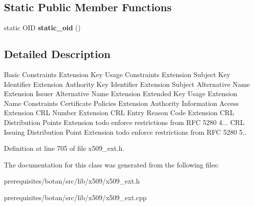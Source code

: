\subsection*{Static Public Member Functions}
\begin{DoxyCompactItemize}
\item 
\mbox{\label{class_botan_1_1_cert___extension_1_1_c_r_l___issuing___distribution___point_aade07378961504397ff8e7917442a18a}} 
static O\+ID {\bfseries static\+\_\+oid} ()
\end{DoxyCompactItemize}


\subsection{Detailed Description}
Basic Constraints Extension Key Usage Constraints Extension Subject Key Identifier Extension Authority Key Identifier Extension Subject Alternative Name Extension Issuer Alternative Name Extension Extended Key Usage Extension Name Constraints Certificate Policies Extension Authority Information Access Extension C\+RL Number Extension C\+RL Entry Reason Code Extension C\+RL Distribution Points Extension todo enforce restrictions from R\+FC 5280 4... C\+RL Issuing Distribution Point Extension todo enforce restrictions from R\+FC 5280 5.. 

Definition at line 705 of file x509\+\_\+ext.\+h.



The documentation for this class was generated from the following files\+:\begin{DoxyCompactItemize}
\item 
prerequisites/botan/src/lib/x509/x509\+\_\+ext.\+h\item 
prerequisites/botan/src/lib/x509/x509\+\_\+ext.\+cpp\end{DoxyCompactItemize}
